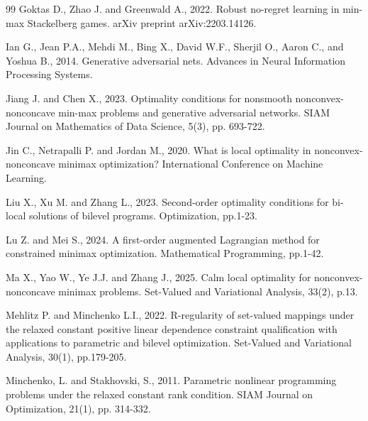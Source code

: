\documentclass[11pt]{article}
\numberwithin{equation}{section}
\begin{document}
{\begin{thebibliography}{99}
 Goktas D., Zhao J. and Greenwald A., 2022. Robust no-regret learning in min-max Stackelberg games. arXiv preprint arXiv:2203.14126.



  Ian G., Jean P.A., Mehdi M., Bing X., David W.F., Sherjil O., Aaron C., and Yoshua B., 2014. Generative adversarial nets. Advances in Neural Information Processing Systems.

 Jiang J. and Chen X., 2023. Optimality conditions for nonsmooth nonconvex-nonconcave min-max problems and generative adversarial networks. SIAM Journal on Mathematics of Data Science, 5(3), pp. 693-722.

 Jin C., Netrapalli P. and Jordan M., 2020. What is local optimality in nonconvex-nonconcave minimax optimization? International Conference on Machine Learning.%


 Liu X., Xu M. and Zhang L., 2023. Second-order optimality conditions for bi-local solutions of bilevel programs. Optimization, pp.1-23.

 Lu Z. and Mei S., 2024. A first-order augmented Lagrangian method for constrained minimax optimization. Mathematical Programming, pp.1-42.

 Ma X., Yao W., Ye J.J. and Zhang J., 2025. Calm local optimality for nonconvex-nonconcave minimax problems. Set-Valued and Variational Analysis, 33(2), p.13.

 Mehlitz P. and Minchenko L.I., 2022. R-regularity of set-valued mappings under the relaxed constant positive linear dependence constraint qualification with applications to parametric and bilevel optimization. Set-Valued and Variational Analysis, 30(1), pp.179-205.

 Minchenko, L. and Stakhovski, S., 2011. Parametric nonlinear programming problems under the relaxed constant rank condition. SIAM Journal on Optimization, 21(1), pp. 314-332.


\end{thebibliography}}
\end{document}
